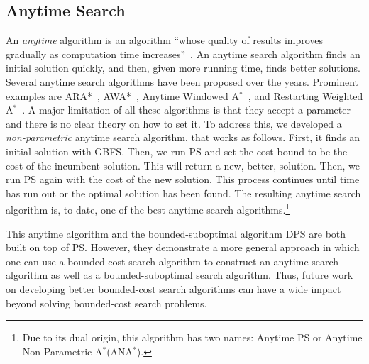 \documentclass{article}
\newcommand{\dps}{\ac{DPS}\xspace}
\newcommand{\ps}{\ac{PS}\xspace}
\newcommand{\astar}{A$^*$\xspace}
\newcommand{\ara}{\ac{ARA*}\xspace}
\newcommand{\awa}{\ac{AWA*}\xspace}
\newcommand{\gbfs}{\ac{GBFS}\xspace}
\begin{document}
\subsection{Anytime Search}
An \emph{anytime} algorithm is an algorithm ``whose quality of results improves gradually as computation time increases''~\cite{zilberstein1996using}. An anytime search algorithm finds an initial solution quickly, and then, given more running time, finds better solutions. Several anytime search algorithms have been proposed over the years. Prominent examples are \ara~\cite{likhachevGT03AnytimeRepairingAstar}, \awa~\cite{hansen2007anytime}, Anytime Windowed \astar~\cite{aine2007awa}, and 
Restarting Weighted \astar~\cite{richter2010joy}. A major limitation of all these algorithms is that they accept a parameter and there is no clear theory on how to set it. To address this, we developed a \emph{non-parametric} anytime search algorithm, that works as follows. First, it finds an initial solution with \gbfs. Then, we run \ps and set the cost-bound to be the cost of the incumbent solution. 
This will return a new, better, solution. Then, we run \ps again with the cost of the new solution. This process continues until time has run out or the optimal solution has been found. 
The resulting anytime search algorithm is, to-date, one of the best anytime search algorithms.\footnote{Due to its dual origin, this algorithm has two names: Anytime \ps or Anytime Non-Parametric \astar (AN\astar).}


This anytime algorithm and the bounded-suboptimal algorithm \dps are both built on top of \ps. However, they demonstrate a more general approach in which one can use a bounded-cost search algorithm to construct an anytime search algorithm as well as a bounded-suboptimal search algorithm. 
Thus, future work on developing better bounded-cost search algorithms can have a wide impact beyond solving bounded-cost search problems. 


\end{document}

